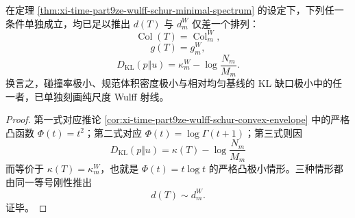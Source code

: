 \begin{theorem}[单泛函刚性]\label{thm:xi-time-part9ze-single-functional-rigidity}
在定理 \ref{thm:xi-time-part9ze-wulff-schur-minimal-spectrum} 的设定下，下列任一条件单独成立，均已足以推出 \(d(T)\) 与 \(d_m^W\) 仅差一个排列：
\[
\operatorname{Col}(T)=\operatorname{Col}_m^W,
\]
\[
g(T)=g_m^W,
\]
\[
D_{\mathrm{KL}}(p\Vert u)=
\kappa_m^W-\log\frac{N_m}{M_m}.
\]
换言之，碰撞率极小、规范体积密度极小与相对均匀基线的 KL 缺口极小中的任一者，已单独刻画纯尺度 Wulff 射线。
\end{theorem}
\begin{proof}
第一式对应推论 \ref{cor:xi-time-part9ze-wulff-schur-convex-envelope} 中的严格凸函数 \(\Phi(t)=t^2\)；第二式对应 \(\Phi(t)=\log\Gamma(t+1)\)；第三式则因
\[
D_{\mathrm{KL}}(p\Vert u)=\kappa(T)-\log\frac{N_m}{M_m}
\]
而等价于 \(\kappa(T)=\kappa_m^W\)，也就是 \(\Phi(t)=t\log t\) 的严格凸极小情形。三种情形都由同一等号刚性推出
\[
d(T)\sim d_m^W.
\]
证毕。
\end{proof}

